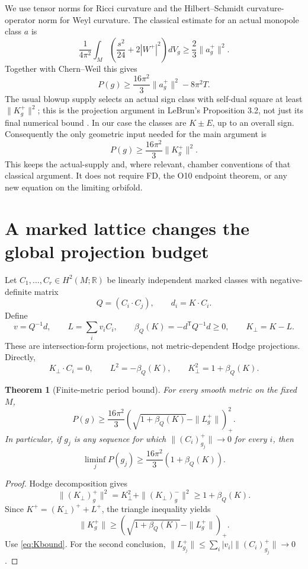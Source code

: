 \documentclass[11pt,a4paper]{article}
\newtheorem{theorem}{Theorem}[section]
\theoremstyle{definition}
\theoremstyle{remark}
\begin{document}
We use tensor norms for Ricci curvature and the Hilbert--Schmidt
curvature-operator norm for Weyl curvature. The classical estimate for an
actual monopole class $a$ is
\[
 \frac1{4\pi^2}\int_M\left(\frac{s^2}{24}+2|W^+|^2\right)dV_g
 \ge\frac23\|a_g^+\|^2.
\]
Together with Chern--Weil this gives
\begin{equation}\label{eq:classical}
 P(g)\ge\frac{16\pi^2}{3}\|a_g^+\|^2-8\pi^2T.
\end{equation}
The usual blowup supply selects an actual sign class with self-dual
square at least $\|K_g^+\|^2$; this is the projection argument in
LeBrun's Proposition 3.2, not just its final numerical bound
\cite{LeBrun}. In our case the classes are $K\pm E$, up to an overall sign.
Consequently the only geometric input needed for the main argument is
\begin{equation}\label{eq:Kbound}
 \boxed{P(g)\ge\frac{16\pi^2}{3}\|K_g^+\|^2.}
\end{equation}
This keeps the actual-supply and, where relevant, chamber conventions of that
classical argument. It does not require FD, the O10 endpoint theorem, or any
new equation on the limiting orbifold.

\section{A marked lattice changes the global projection budget}
Let $C_1,\ldots,C_r\in H^2(M;\mathbb R)$ be linearly independent marked
classes with negative-definite matrix
\[
 Q=(C_i\cdot C_j),\qquad d_i=K\cdot C_i.
\]
Define
\begin{equation}\label{eq:beta}
 v=Q^{-1}d,\qquad L=\sum_i v_iC_i,\qquad
 \beta_Q(K)=-d^{\mathsf T}Q^{-1}d\ge0,\qquad K_\perp=K-L.
\end{equation}
These are intersection-form projections, not metric-dependent Hodge
projections. Directly,
\begin{equation}\label{eq:perp}
 K_\perp\cdot C_i=0,\qquad L^2=-\beta_Q(K),\qquad
 K_\perp^2=1+\beta_Q(K).
\end{equation}

\begin{theorem}[Finite-metric period bound]\label{thm:finite}
For every smooth metric on the fixed $M$,
\begin{equation}\label{eq:finite}
 \boxed{
 P(g)\ge\frac{16\pi^2}{3}
 \left(\sqrt{1+\beta_Q(K)}-\|L_g^+\|\right)_+^2.
 }
\end{equation}
In particular, if $g_j$ is any sequence for which
$\|(C_i)^+_{g_j}\|\to0$ for every $i$, then
\begin{equation}\label{eq:limit}
 \boxed{\liminf_jP(g_j)\ge
 \frac{16\pi^2}{3}\left(1+\beta_Q(K)\right).}
\end{equation}
\end{theorem}
\begin{proof}
Hodge decomposition gives
\[
 \|(K_\perp)^+_g\|^2
 =K_\perp^2+\|(K_\perp)^-_g\|^2\ge1+\beta_Q(K).
\]
Since $K^+=(K_\perp)^++L^+$, the triangle inequality yields
\[
 \|K_g^+\|\ge
 \left(\sqrt{1+\beta_Q(K)}-\|L_g^+\|\right)_+.
\]
Use \eqref{eq:Kbound}. For the second conclusion,
$\|L_{g_j}^+\|\le\sum_i|v_i|\|(C_i)^+_{g_j}\|\to0$.
\end{proof}
\end{document}
